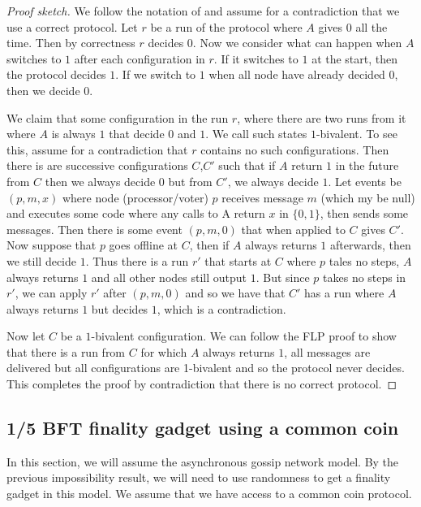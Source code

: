 \documentclass{article}
\begin{document}
\begin{proof}[Proof sketch] We follow the notation of  \cite{flp} and assume for a contradiction that we use a correct protocol. 
Let $r$ be a run of the protocol where $A$ gives $0$ all the time.
Then by correctness $r$ decides $0$. Now we consider what can happen when $A$ switches to $1$ after each configuration in $r$. If it switches to $1$ at the start, then the protocol decides $1$.
If we switch to $1$ when all node have already decided $0$, then we decide $0$.

We claim that some configuration in the run $r$, where there are two runs from it where $A$ is always $1$ that decide $0$ and $1$. We call such states $1$-bivalent.
To see this, assume for a contradiction that $r$ contains no such configurations. Then there is are successive configurations $C$,$C'$ such that if $A$ return $1$ in the future from $C$ then we always decide $0$ but from $C'$, we always decide $1$.
Let events be $(p,m,x)$ where node (processor/voter) $p$ receives message $m$ (which my be null) and executes some code where any calls to A return $x$ in $\{0,1\}$, then sends some messages. 
Then there is some event $(p,m,0)$ that when applied to $C$ gives $C'$. Now suppose that $p$ goes offline at $C$, then if $A$ always returns $1$ afterwards, then we still decide $1$. Thus there is a run $r'$ that starts at $C$ where $p$ tales no steps, $A$ always returns $1$ and all other nodes still output $1$.
But since $p$ takes no steps in $r'$, we can apply $r'$ after $(p, m, 0)$ and so we have that $C'$ has a run where $A$ always returns $1$ but decides $1$, which is a contradiction.

Now let $C$ be a $1$-bivalent configuration. We can follow the FLP proof to show that there is a run from $C$ for which $A$ always returns $1$, all messages are delivered but all configurations are 1-bivalent and so the protocol never decides. This completes the proof by contradiction that there is no correct protocol.
\end{proof}

\subsection{1/5 BFT finality gadget using a common coin}

In this section, we will assume the asynchronous gossip network model. By the previous impossibility result, we will need to use randomness to get a finality gadget in this model. We assume that we have access to a common coin protocol.
 
\end{document}
